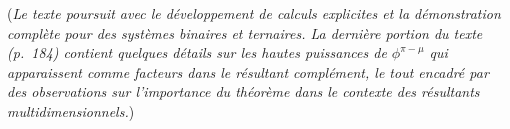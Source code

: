 \documentclass[11pt,a4paper]{article}
\begin{document}
\medskip

\noindent (\emph{Le texte poursuit avec le d\'eveloppement de calculs explicites et la d\'emonstration compl\`ete pour des syst\`emes binaires et ternaires. La derni\`ere portion du texte (p.\ 184) contient quelques d\'etails sur les hautes puissances de $\phi^{\pi - \mu}$ qui apparaissent comme facteurs dans le r\'esultant compl\'ement, le tout encadr\'e par des observations sur l'importance du th\'eor\`eme dans le contexte des r\'esultants multidimensionnels.})

\end{document}
